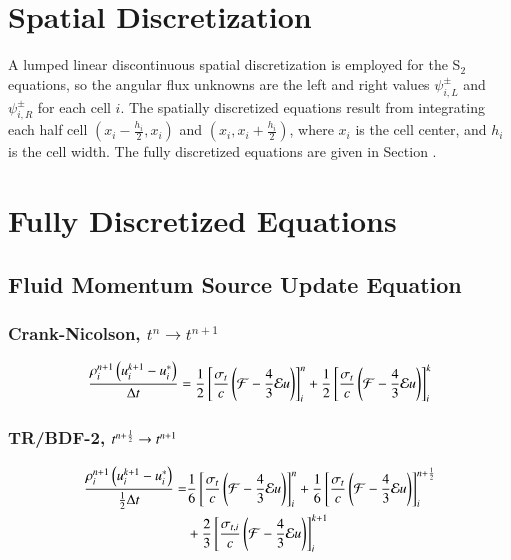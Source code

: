\documentclass[preprint,12pt]{elsarticle}
\begin{document}
\section{Spatial Discretization}

A lumped linear discontinuous spatial discretization is employed
for the S$_2$ equations, so the angular flux
unknowns are the left and right values $\psi_{i,L}^\pm$ and
$\psi_{i,R}^\pm$ for each cell $i$. The spatially
discretized equations result from integrating each half cell
$(x_i-\frac{h_i}{2},x_i)$ and $(x_i,x_i+\frac{h_i}{2})$,
where $x_i$ is the cell center, and $h_i$ is the cell width.
The fully discretized equations are given in Section .

\section{Fully Discretized Equations}
\subsection{Fluid Momentum Source Update Equation}
\subsubsection{Crank-Nicolson, $t^n\rightarrow t^{n+1}$}
\begin{equation}
  \frac{\rho_i^{n+1}\left(u_i^{k+1}-u_i^*\right)}{\dt} = 
   \half\left[\frac{\sigma_{t}}{c}\left(\F-\frac{4}{3}\E u\right)\right]_i^n
  +\half\left[\frac{\sigma_{t}}{c}\left(\F-\frac{4}{3}\E u\right)\right]_i^k
\lequ{hydromCNfull}
\end{equation}

\subsubsection{TR/BDF-2, $t^{n+\frac{1}{2}}\rightarrow t^{n+1}$}
\begin{equation}\begin{split}
  \frac{\rho_i^{n+1}\left(u_i^{k+1}-u_i^*\right)}{\half\dt} =  
  & \sixth\left[\frac{\sigma_{t}}{c}\left(\F-\frac{4}{3}\E u\right)\right]_i^n
   +\sixth\left[\frac{\sigma_{t}}{c}\left(\F-\frac{4}{3}\E u\right)\right]_i^{n+\half}\\
  &+\frac{2}{3}\left[\frac{\sigma_{t,i}}{c}\left(\F-\frac{4}{3}\E u\right)\right]_i^{k+1}
\lequ{hydromBDF2full}
\end{split}\end{equation}
\end{document}
